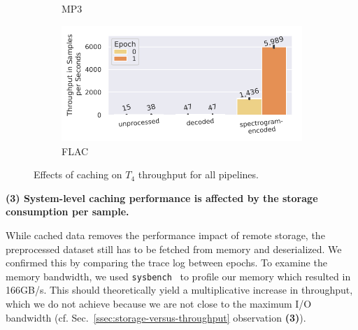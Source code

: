 {\begin{figure}[h]
\begin{subfigure}[c]{0.22\textwidth}
        \vspace{-18pt}
        \caption{MP3}
        \label{fig:caching-mp3}
    \end{subfigure}
    \begin{minipage}[c]{0.22\textwidth}
        \begin{subfigure}[c]{\textwidth}
            \includegraphics[width=\textwidth]{figures/librispeech-pipeline/caching-over-epochs.pdf}
            \vspace{-18pt}
            \caption{FLAC}
            \label{fig:caching-flac}
        \end{subfigure}
    \end{minipage}\hspace{5mm}
    \begin{minipage}[c]{0.20\textwidth}
        \vspace{-18pt}
        \caption{{\color{diff}Effects of caching on $T_4$ throughput for all pipelines.}}
        \label{fig:caching}
    \end{minipage}
\end{figure}
\vspace{-0.3cm}

\textbf{(3) System-level caching performance is affected by the storage consumption per sample. }

While cached data removes the performance impact of remote storage, the preprocessed dataset still has to be fetched from memory and deserialized.
We confirmed this by comparing the trace log between epochs.
To examine the memory bandwidth, we used \texttt{sysbench}~\cite{sysbench} to profile our memory which resulted in 166\:GB/s.
This should theoretically yield a multiplicative increase in throughput, which we do not achieve because we are not close to the maximum I/O bandwidth (cf. Sec.~\ref{ssec:storage-versus-throughput} observation \textbf{(3)}).

}
